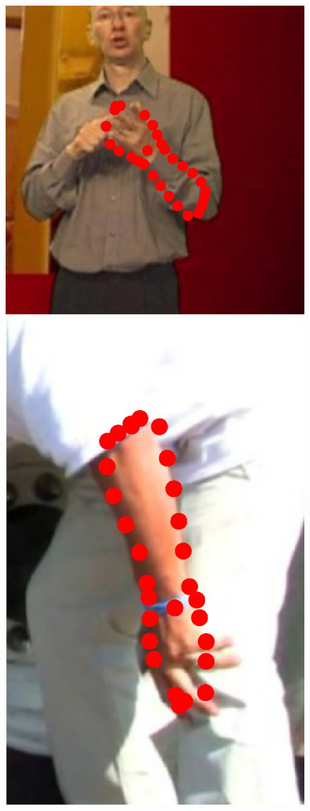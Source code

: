 \begin{figure}[!t]
    \includegraphics[height=\ofh]{Suplementory_Meterial/ExFit/0011.eps}
    \hfill
    \includegraphics[height=\ofh]{Suplementory_Meterial/ExFit/0012.eps}

\end{figure}

